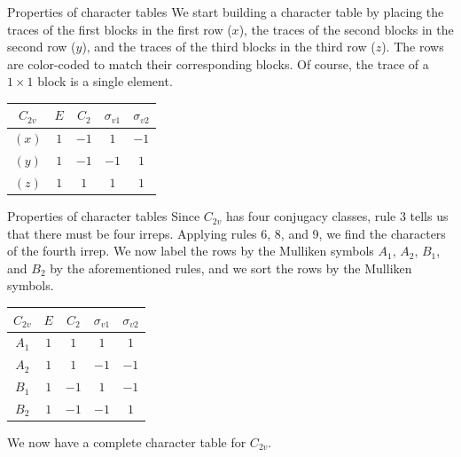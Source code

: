 \documentclass{beamer}
\begin{document}
    \begin{frame}{Properties of character tables}
        We start building a character table by placing the traces of the first blocks in the first row ($x$), the traces of the second blocks in the second row ($y$), and the traces of the third blocks in the third row ($z$). The rows are color-coded to match their corresponding blocks. Of course, the trace of a $1\times 1$ block is a single element.
    
        \begin{table}[htbp]
            \centering
            \renewcommand{\arraystretch}{1.5}
            \begin{tabular}{c|cccc}
                $C_{2v}$ & $E$ & $C_2$ & $\sigma_{v1}$ & $\sigma_{v2}$\\
                \hline
                \color{red}$(x)$ & \color{red}$1$ & \color{red}$-1$ & \color{red}$1$ & \color{red}$-1$\\
                \color{green!60!black}$(y)$ & \color{green!60!black}$1$ & \color{green!60!black}$-1$ & \color{green!60!black}$-1$ & \color{green!60!black}$1$\\
                \color{blue}$(z)$ & \color{blue}$1$ & \color{blue}$1$ & \color{blue}$1$ & \color{blue}$1$
            \end{tabular}
        \end{table}
    \end{frame}

    \begin{frame}{Properties of character tables}
        Since $C_{2v}$ has four conjugacy classes, rule 3 tells us that there must be four irreps. Applying rules 6, 8, and 9, we find the characters of the fourth irrep. We now label the rows by the Mulliken symbols $A_1$, $A_2$, $B_1$, and $B_2$ by the aforementioned rules, and we sort the rows by the Mulliken symbols.
    
        \begin{table}[htbp]
            \centering
            \renewcommand{\arraystretch}{1.5}
            \begin{tabular}{c|cccc}
                $C_{2v}$ & $E$ & $C_2$ & $\sigma_{v1}$ & $\sigma_{v2}$\\
                \hline
                $A_1$ & $1$ & $1$ & $1$ & $1$\\
                $A_2$ & $1$ & $1$ & $-1$ & $-1$\\
                $B_1$ & $1$ & $-1$ & $1$ & $-1$\\
                $B_2$ & $1$ & $-1$ & $-1$ & $1$\\
            \end{tabular}
        \end{table}
        
        We now have a complete character table for $C_{2v}$.
    \end{frame}
\end{document}
